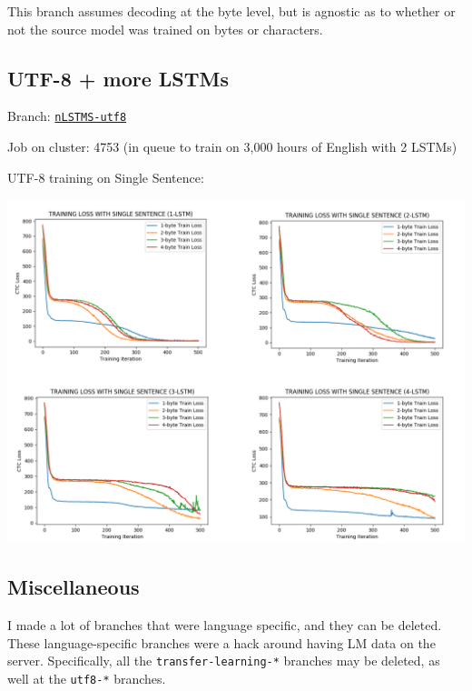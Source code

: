 \documentclass[12pt,a4paper]{article}
\begin{document}
This branch assumes decoding at the byte level, but is agnostic as to whether or not the source model was trained on bytes or characters.
\newpage

\subsection*{UTF-8 + more LSTMs}

Branch: \href{https://github.com/mozilla/DeepSpeech/tree/nLSTMS-utf8}{\texttt{nLSTMS-utf8}}

Job on cluster: 4753 (in queue to train on 3,000 hours of English with 2 LSTMs)

UTF-8 training on Single Sentence:

\begin{center}
\includegraphics[width=.85\textwidth,keepaspectratio]{figs/2.png}
\end{center}

\subsection*{Miscellaneous}

I made a lot of branches that were language specific, and they can be deleted. These language-specific branches were a hack around having LM data on the server. Specifically, all the \texttt{transfer-learning-*} branches may be deleted, as well at the \texttt{utf8-*} branches.
\end{document}
